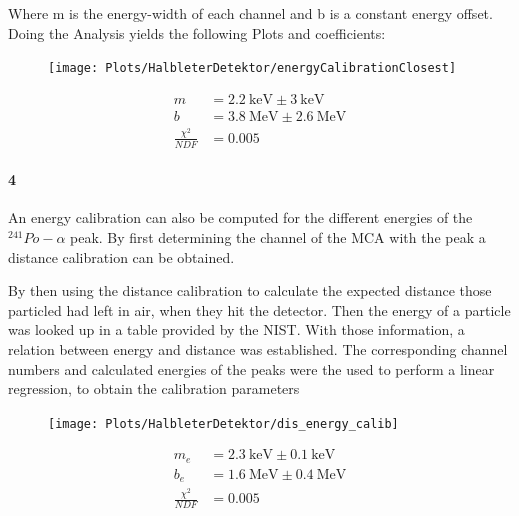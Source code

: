 \documentclass[12pt,twoside,a4paper]{scrartcl}
\begin{document}
			Where m is the energy-width of each channel and b is a constant energy offset.
			Doing the Analysis yields the following Plots and coefficients:

			\begin{figure}[H]
					\begin{minipage}{0.69 \textwidth}
						\texttt{[image: Plots/HalbleterDetektor/energyCalibrationClosest]}
					\end{minipage}
					\begin{minipage}{0.29 \textwidth}
						\begin{align*}
							m &= \SI{2.2}{\kilo \electronvolt} \pm \SI{3}{\kilo \electronvolt} \\
							b &= \SI{3.8}{\mega \electronvolt} \pm \SI{2.6}{\mega \electronvolt} \\
							\frac{\chi^2}{NDF} &= 0.005
						\end{align*}
					\end{minipage}
				\end{figure}

		\paragraph{4}

			An energy calibration can also be computed for the different energies of the $^{241}Po-\alpha$ peak. By first determining the channel of the MCA with the peak a distance calibration can be obtained.

			By then using the distance calibration to calculate the expected distance those particled had left in air, when they hit the detector. Then the energy of a particle was looked up in a table provided by the NIST.
			With those information, a relation between energy and distance was established. The corresponding channel numbers and calculated energies of the peaks were the used to perform a linear regression, to obtain the calibration parameters

			\begin{figure}[H]
					\begin{minipage}{0.69 \textwidth}
						\texttt{[image: Plots/HalbleterDetektor/dis\_energy\_calib]}
					\end{minipage}
					\begin{minipage}{0.29 \textwidth}
						\begin{align*}
							m_e &= \SI{2.3}{\kilo \electronvolt} \pm \SI{0.1}{\kilo \electronvolt} \\
							b_e &= \SI{1.6}{\mega \electronvolt} \pm \SI{0.4}{\mega \electronvolt} \\
							\frac{\chi^2}{NDF} &= 0.005
						\end{align*}
					\end{minipage}
				\end{figure}
\end{document}
